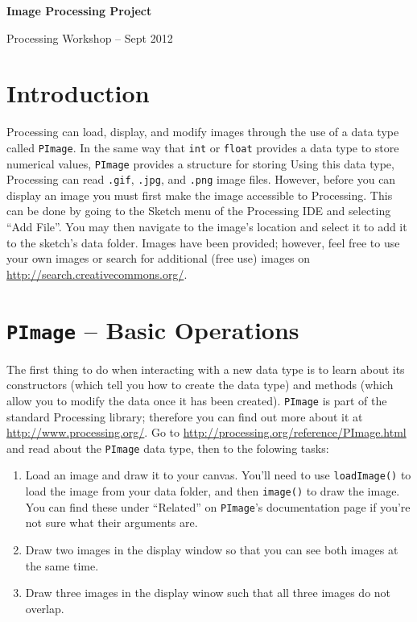 \documentclass[11pt]{article}
\begin{document}
\thispagestyle{empty}
\centerline{\Large \bf Image Processing Project}
\medskip
\centerline{Processing Workshop -- Sept 2012}
\bigskip

\section{Introduction}
Processing can load, display, and modify images through the use of a data type called {\tt PImage}.  In the same way that {\tt int} or {\tt float} provides a data type to store numerical values, {\tt PImage} provides a structure for storing Using this data type, Processing can read {\tt .gif}, {\tt .jpg}, and {\tt .png} image files.  However, before you can display an image you must first make the image accessible to Processing.  This can be done by going to the Sketch menu of the Processing IDE and selecting ``Add File''.  You may then navigate to the image's location and select it to add it to the sketch's data folder.  Images have been provided; however, feel free to use your own images or search for additional (free use) images on \url{http://search.creativecommons.org/}.

\section{{\tt PImage} -- Basic Operations}
The first thing to do when interacting with a new data type is to learn about its constructors (which tell you how to create the data type) and methods (which allow you to modify the data once it has been created).  {\tt PImage} is part of the standard Processing library; therefore you can find out more about it at \url{http://www.processing.org/}.  Go to \url{http://processing.org/reference/PImage.html} and read about the {\tt PImage} data type, then to the folowing tasks:

\begin{enumerate}
\item Load an image and draw it to your canvas.  You'll need to use {\tt loadImage()} to load the image from your data folder, and then {\tt image()} to draw the image.  You can find these under ``Related'' on {\tt PImage}'s documentation page if you're not sure what their arguments are.
\item Draw two images in the display window so that you can see both images at the same time.
\item Draw three images in the display winow such that all three images do not overlap.
\end{enumerate}
\end{document}
